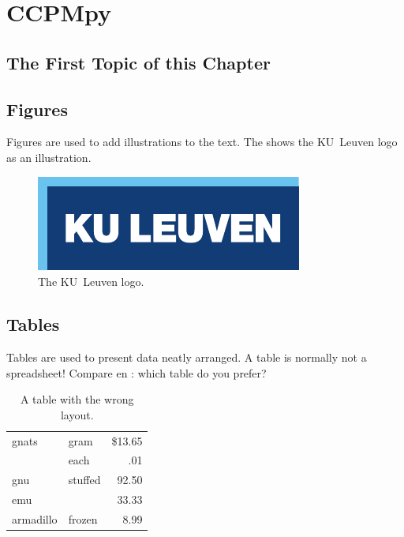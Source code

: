 \chapter{CCPMpy}
\label{cha:4}

\section{The First Topic of this Chapter}


\section{Figures}
Figures are used to add illustrations to the text. The  shows
the KU~Leuven logo as an illustration.
\begin{figure}
	\centering
	\includegraphics{logokul}
	\caption{The KU~Leuven logo.}
	\label{fig:logo}
\end{figure}

\section{Tables}
Tables are used to present data neatly arranged. A table is normally
not a spreadsheet! Compare  en : which table do
you prefer?

\begin{table}
	\centering
	\begin{tabular}{||l|lr||} \hline
		gnats     & gram      & \$13.65 \\ \cline{2-3}
		& each      & .01 \\ \hline
		gnu       & stuffed   & 92.50 \\ \cline{1-1} \cline{3-3}
		emu       &           & 33.33 \\ \hline
		armadillo & frozen    & 8.99 \\ \hline
	\end{tabular}
	\caption{A table with the wrong layout.}
	\label{tab:wrong}
\end{table}

